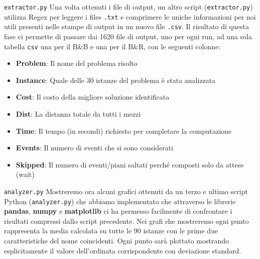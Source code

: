 \documentclass[10pt]{beamer}
\begin{document}
    \begin{frame}{\texttt{extractor.py}}
        Una volta ottenuti i file di output, un altro script (\texttt{extractor.py}) utilizza Regex per leggere i files \texttt{.txt} e comprimere le uniche informazioni per noi utili presenti nelle stampe di output in un nuovo file \texttt{.csv}. Il risultato di questa fase ci permette di passare dai 1620 file di output, uno per ogni run, ad una sola tabella \texttt{csv} una per il B\&B e una per il B\&R, con le seguenti colonne: 
        \begin{itemize}
             \item \textbf{Problem}: Il nome del problema risolto
            \item \textbf{Instance}: Quale delle 30 istanze del problema è stata analizzata
            \item \textbf{Cost}: Il costo della migliore soluzione identificata
            \item\textbf{Dist}: La distanza totale da tutti i mezzi
            \item\textbf{Time}: Il tempo (in secondi) richiesto per completare la computazione
            \item \textbf{Events}: Il numero di eventi che si sono considerati
            \item \textbf{Skipped}: Il numero di eventi/piani saltati perché composti solo da attese (wait)
        \end{itemize}
    \end{frame}

    \begin{frame}{\texttt{analyzer.py}}
        Mostreremo ora alcuni grafici ottenuti da un terzo e ultimo script Python (\texttt{analyzer.py}) che abbiamo implementato che attraverso le librerie \textbf{pandas}, \textbf{numpy} e \textbf{matplotlib} ci ha permesso facilmente di confrontare i risultati compressi dallo script precedente.
        \newline Nei grafi che mostreremo ogni punto rappresenta la media calcolata su tutte le 90 istanze con le prime due caratteristiche del nome coincidenti. Ogni punto sarà plottato mostrando esplicitamente il valore dell'ordinata corrispondente con deviazione standard.
    \end{frame}
\end{document}
